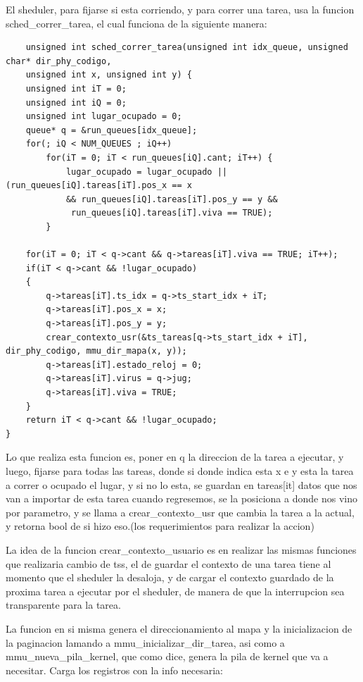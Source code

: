 \documentclass[a4paper]{article}
\newenvironment{codesnippet}{%
	\begin{Sbox}\begin{minipage}{\textwidth}\sffamily\small}%
	{\end{minipage}\end{Sbox}%
		\begin{center}%
		\vspace{-0.4cm}\colorbox{litegrey}{\TheSbox}\end{center}\vspace{0.3cm}}
\begin{document}
El sheduler, para fijarse si esta corriendo, y para correr una tarea,  usa la funcion sched_correr_tarea, el cual funciona de la siguiente manera:

\begin{codesnippet}
\begin{verbatim}		
	unsigned int sched_correr_tarea(unsigned int idx_queue, unsigned char* dir_phy_codigo,
	unsigned int x, unsigned int y) {
    unsigned int iT = 0;
    unsigned int iQ = 0;
    unsigned int lugar_ocupado = 0;
    queue* q = &run_queues[idx_queue];
    for(; iQ < NUM_QUEUES ; iQ++) 
        for(iT = 0; iT < run_queues[iQ].cant; iT++) {
            lugar_ocupado = lugar_ocupado || (run_queues[iQ].tareas[iT].pos_x == x 
            && run_queues[iQ].tareas[iT].pos_y == y &&
             run_queues[iQ].tareas[iT].viva == TRUE);
        }

    for(iT = 0; iT < q->cant && q->tareas[iT].viva == TRUE; iT++);
    if(iT < q->cant && !lugar_ocupado)
    {
        q->tareas[iT].ts_idx = q->ts_start_idx + iT;
        q->tareas[iT].pos_x = x;
        q->tareas[iT].pos_y = y;
        crear_contexto_usr(&ts_tareas[q->ts_start_idx + iT], dir_phy_codigo, mmu_dir_mapa(x, y));
        q->tareas[iT].estado_reloj = 0;
        q->tareas[iT].virus = q->jug;
        q->tareas[iT].viva = TRUE;
    }
    return iT < q->cant && !lugar_ocupado;
}

\end{verbatim}
\end{codesnippet}

Lo que realiza esta funcion es,  poner en q la direccion de la tarea a ejecutar, y luego, fijarse para todas las tareas, donde si donde indica esta x e y esta la tarea a correr o ocupado el lugar, y si no lo esta, se guardan en tareas[it] datos que nos van a importar de esta tarea cuando regresemos,  se la posiciona a donde nos vino por parametro, y se llama a crear_contexto_usr que cambia la tarea a la actual, y retorna bool de si hizo eso.(los requerimientos para realizar la accion)



La idea de la funcion crear_contexto_usuario es en realizar las mismas funciones que realizaria cambio de  tss, el de guardar el contexto de una tarea tiene al momento que el sheduler la desaloja, y de cargar el contexto guardado de la proxima tarea a  ejecutar por el sheduler, de manera de que la interrupcion sea transparente para la tarea. 


La funcion en si misma genera el direccionamiento al mapa y la inicializacion de la paginacion lamando a  mmu_inicializar_dir_tarea, asi como a mmu_nueva_pila_kernel, que como dice, genera la pila de kernel que va a necesitar. Carga los registros con la info necesaria:
\end{document}
